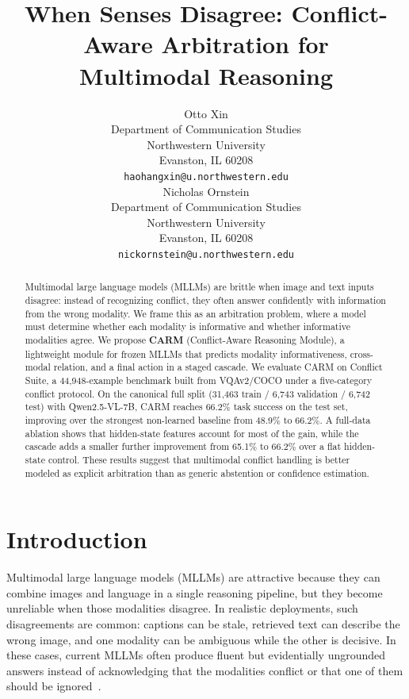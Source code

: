 \documentclass[11pt]{article}
\title{When Senses Disagree: Conflict-Aware Arbitration for\\Multimodal Reasoning}
\author{Otto Xin \\
  Department of Communication Studies \\
  Northwestern University \\
  Evanston, IL 60208 \\
  \texttt{haohangxin@u.northwestern.edu} \\\And
  Nicholas Ornstein \\
  Department of Communication Studies \\
  Northwestern University \\
  Evanston, IL 60208 \\
  \texttt{nickornstein@u.northwestern.edu}}
\begin{document}
\maketitle

\begin{abstract}
Multimodal large language models (MLLMs) are brittle when image and text inputs disagree: instead of recognizing conflict, they often answer confidently with information from the wrong modality. We frame this as an arbitration problem, where a model must determine whether each modality is informative and whether informative modalities agree. We propose \textbf{CARM} (Conflict-Aware Reasoning Module), a lightweight module for frozen MLLMs that predicts modality informativeness, cross-modal relation, and a final action in a staged cascade. We evaluate CARM on Conflict Suite, a 44,948-example benchmark built from VQAv2/COCO under a five-category conflict protocol. On the canonical full split (31,463 train / 6,743 validation / 6,742 test) with Qwen2.5-VL-7B, CARM reaches 66.2\% task success on the test set, improving over the strongest non-learned baseline from 48.9\% to 66.2\%. A full-data ablation shows that hidden-state features account for most of the gain, while the cascade adds a smaller further improvement from 65.1\% to 66.2\% over a flat hidden-state control. These results suggest that multimodal conflict handling is better modeled as explicit arbitration than as generic abstention or confidence estimation.
\end{abstract}


\section{Introduction}
\label{sec:intro}

Multimodal large language models (MLLMs) are attractive because they can combine images and
language in a single reasoning pipeline, but they become unreliable when those modalities
disagree. In realistic deployments, such disagreements are common: captions can be stale,
retrieved text can describe the wrong image, and one modality can be ambiguous while the
other is decisive. In these cases, current MLLMs often produce fluent but evidentially
ungrounded answers instead of acknowledging that the modalities conflict or that one of
them should be ignored~\citep{huaHowVisionLanguageModels2025,popordanoskaCLASHBenchmarkCrossModal2025,zhangRobustMultimodalLarge2025,dengWordsVisionVisionLanguage2025,yanMultimodalInconsistencyReasoning2025}.
\end{document}
